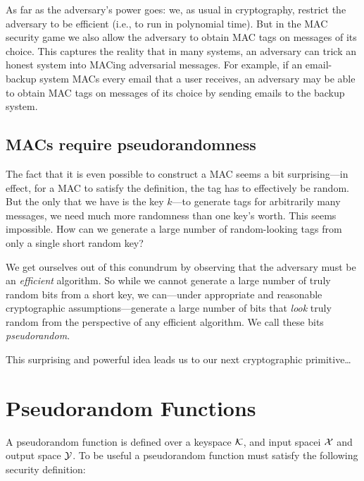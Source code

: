 As far as the adversary's power goes: we, as usual in cryptography,
restrict the adversary to be efficient (i.e., to run in polynomial time).
But in the MAC security game we also allow the adversary to obtain
MAC tags on messages of its choice.
This captures the reality that in many systems, an adversary can trick
an honest system into MACing adversarial messages.
For example, if an email-backup system MACs every email that a
user receives, an adversary may be able to obtain MAC tags on messages
of its choice by sending emails to the backup system.


\subsection{MACs require pseudorandomness}
The fact that it is even possible to construct a MAC seems a bit surprising---in effect, for a MAC to satisfy the definition, the tag has to effectively be random. But the only  that we have is the key $k$---to generate tags for arbitrarily many messages, we need much more randomness than one key's worth. This seems impossible.
How can we generate a large number of random-looking tags from only a single
short random key?

We get ourselves out of this conundrum by observing that the adversary
must be an \emph{efficient} algorithm.
So while we cannot generate a large number of truly random bits from a
short key, we can---under appropriate and reasonable
cryptographic assumptions---generate a large number of bits that \emph{look}
truly random from the perspective of any efficient algorithm.
We call these bits \emph{pseudorandom}.

This surprising and powerful idea leads us to our next cryptographic primitive\ldots

\section{Pseudorandom Functions}

A pseudorandom function is defined over a keyspace $\mathcal{K}$,
and input spacei $\mathcal{X}$ and output space $\mathcal{Y}$.
To be useful a pseudorandom function must satisfy the following
security definition:


